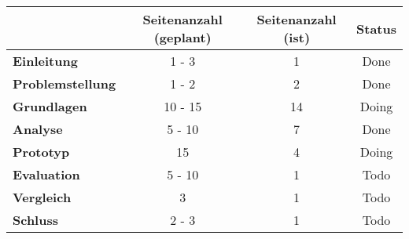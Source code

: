 \begin{table}[H]
\centering
\begin{tabular}{l|c|c|c}
                               & \textbf{Seitenanzahl (geplant)} & \textbf{Seitenanzahl (ist)} & \textbf{Status}        \\ \hline
\textbf{Einleitung}            & 1 - 3                           & {\color{yellow} 1}          & {\color{green} Done}   \\ \hline
\textbf{Problemstellung}       & 1 - 2                           & {\color{green} 2}           & {\color{green} Done}   \\ \hline
\textbf{Grundlagen}            & 10 - 15                         & {\color{green} 14}          & {\color{yellow} Doing} \\ \hline
\textbf{Analyse}               & 5 - 10                          & {\color{green} 7}           & {\color{green} Done}   \\ \hline
\textbf{Prototyp}              & 15                              & {\color{red} 4}             & {\color{yellow} Doing} \\ \hline
\textbf{Evaluation}            & 5 - 10                          & {\color{red} 1}             & {\color{red} Todo}     \\ \hline
\textbf{Vergleich}             & 3                               & {\color{red} 1}             & {\color{red} Todo}     \\ \hline
\textbf{Schluss}               & 2 - 3                           & {\color{red} 1}             & {\color{red} Todo}     \\
\end{tabular}
\end{table}